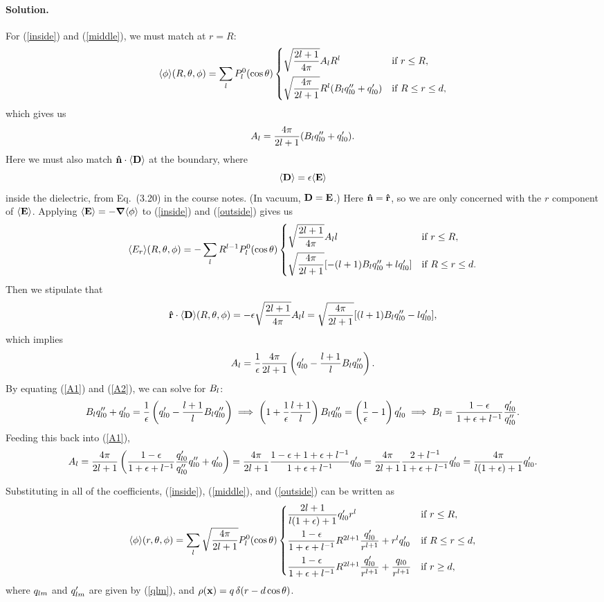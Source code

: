 \documentclass[11pt]{article}
\newcommand{\refeq}[1]{(\ref{#1})}
\newcommand{\beq}{\begin{equation*}}
\newcommand{\eeq}{\end{equation*}}
\newcommand{\beqn}{\begin{equation}}
\newcommand{\eeqn}{\end{equation}}
\newenvironment{solution}
{
    \paragraph{Solution.}
    \ignorespaces
}
{
    \bigskip
}
\begin{document}
\begin{solution}
	For \refeq{inside} and \refeq{middle}, we must match at $r = R$:
	\beq
		\evphi\!(R, \tht, \phi) = \sum_{l} \Ploct \begin{cases}
			\sqrt{\dfrac{2l + 1}{4\pi}} \Al R^l & \tif r \leq R, \\[2ex]
			\sqrt{\dfrac{4\pi}{2l+1}} R^l (\Bl \qpplo + \qplo) & \tif R \leq r \leq d,
		\end{cases}
	\eeq
	which gives us
	\beqn \label{A1}
		\Al = \frac{4\pi}{2l+1} (\Bl \qpplo + \qplo).
	\eeqn
	Here we must also match $\nh \cdot \evD$ at the boundary, where
	\beqn \label{D}
		\evD = \eps \!\evE
	\eeqn
	inside the dielectric, from Eq.~(3.20) in the course notes.  (In vacuum, $\vb{D} = \vb{E}$.)  Here $\vb{\hat{n}} = \vb{\hat{r}}$, so we are only concerned with the $r$ component of $\evE$.  Applying $\evE = -\grad\!\evphi$ to \refeq{inside} and \refeq{outside} gives us
	\beq
		\evEr\!(R, \tht, \phi) = -\sum_l R^{l-1} \Ploct \begin{cases}
			\sqrt{\dfrac{2l+1}{4\pi}} \Al l & \tif r \leq R, \\[2ex]
			\sqrt{\dfrac{4\pi}{2l+1}} [-(l + 1) \Bl \qpplo + l \qplo] & \tif R \leq r \leq d.
		\end{cases}
	\eeq
	Then we stipulate that
	\beq
		\rh \cdot \evD\!(R, \tht, \phi) = -\eps \sqrt{\frac{2l+1}{4\pi}} \Al l = \sqrt{\frac{4\pi}{2l+1}} [(l + 1) \Bl \qpplo - l \qplo],
	\eeq
	which implies
	\beqn \label{A2}
		\Al = \frac{1}{\eps} \frac{4\pi}{2l+1} \left( \qplo - \frac{l + 1}{l} \Bl \qpplo \right).
	\eeqn
	By equating \refeq{A1} and \refeq{A2}, we can solve for $B_l$:
	\beq
		\Bl \qpplo + \qplo = \frac{1}{\eps} \left( \qplo - \frac{l + 1}{l} \Bl \qpplo \right)
		\implies
		\left( 1 + \frac{1}{\eps} \frac{l + 1}{l} \right) \Bl \qpplo = \left( \frac{1}{\eps} - 1 \right) \qplo
		\implies
		\Bl = \frac{1 - \eps}{1 + \eps + l^{-1}} \frac{\qplo}{\qpplo}.
	\eeq
	Feeding this back into \refeq{A1},
	\beq
		\Al = \frac{4\pi}{2l+1} \left( \frac{1 - \eps}{1 + \eps + l^{-1}} \frac{\qplo}{\qpplo} \qpplo + \qplo \right)
		= \frac{4\pi}{2l+1} \frac{1 - \eps + 1 + \eps + l^{-1}}{1 + \eps + l^{-1}} \qplo
		= \frac{4\pi}{2l+1} \frac{2 + l^{-1}}{1 + \eps + l^{-1}} \qplo
		= \frac{4\pi}{l (1 + \eps) + 1} \qplo.
	\eeq
	
	Substituting in all of the coefficients, \refeq{inside}, \refeq{middle}, and \refeq{outside} can be written as
	\beqn \label{sol1}
		\evphi\!\rtp = \sum_{l} \sqrt{\frac{4\pi}{2l+1}} \Ploct \begin{cases}
			\dfrac{2l + 1}{l (1 + \eps) + 1} \qplo r^l & \tif r \leq R, \\[2ex]
			\dfrac{1 - \eps}{1 + \eps + l^{-1}} R^{2l+1} \dfrac{\qplo}{r^{l+1}} + r^l \qplo & \tif R \leq r \leq d, \\[2ex]
			\dfrac{1 - \eps}{1 + \eps + l^{-1}} R^{2l+1} \dfrac{\qplo}{r^{l+1}} + \dfrac{\qlo}{r^{l+1}} & \tif r \geq d,
		\end{cases}
	\eeqn
	where $q_{l m}$ and $q'_{l m}$ are given by \refeq{qlm}, and $\rho(\vb{x}) = q \,\delta(r - d\cos\theta)$.


\end{solution}
\end{document}
